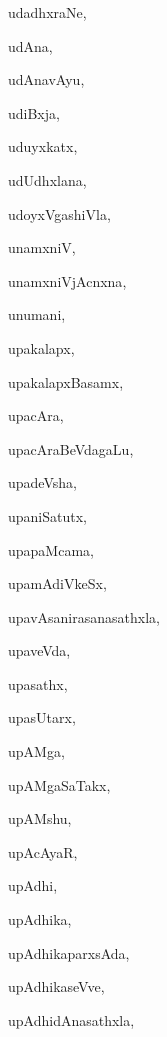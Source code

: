 \begin{multicols}{3}
{\noindent
{udadhxraNe}, \pageref{udadhxraNe}

\noindent
{udAna}, \pageref{udAna}

\noindent
{udAnavAyu}, \pageref{udAnavAyu}

\noindent
{udiBxja}, \pageref{udiBxja}

\noindent
{uduyxkatx}, \pageref{uduyxkatx}

\noindent
{udUdhxlana}, \pageref{udUdhxlana}

\noindent
{udoyxVgashiVla}, \pageref{udoyxVgashiVla}

\noindent
{unamxniV}, \pageref{unamxniV}

\noindent
{unamxniVjAcnxna}, \pageref{unamxniVjAcnxna}

\noindent
{unumani}, \pageref{unumani}

\noindent
{upakalapx}, \pageref{upakalapx}

\noindent
{upakalapxBasamx}, \pageref{upakalapxBasamx}

\noindent
{upacAra}, \pageref{upacAra}

\noindent
{upacAraBeVdagaLu}, \pageref{upacAraBeVdagaLu}

\noindent
{upadeVsha}, \pageref{upadeVsha}

\noindent
{upaniSatutx}, \pageref{upaniSatutx}

\noindent
{upapaMcama}, \pageref{upapaMcama}

\noindent
{upamAdiVkeSx}, \pageref{upamAdiVkeSx}

\noindent
{upavAsanirasanasathxla}, \pageref{upavAsanirasanasathxla}

\noindent
{upaveVda}, \pageref{upaveVda}

\noindent
{upasathx}, \pageref{upasathx}

\noindent
{upasUtarx}, \pageref{upasUtarx}

\noindent
{upAMga}, \pageref{upAMga}

\noindent
{upAMgaSaTakx}, \pageref{upAMgaSaTakx}

\noindent
{upAMshu}, \pageref{upAMshu}

\noindent
{upAcAyaR}, \pageref{upAcAyaR}

\noindent
{upAdhi}, \pageref{upAdhi}

\noindent
{upAdhika}, \pageref{upAdhika}

\noindent
{upAdhikaparxsAda}, \pageref{upAdhikaparxsAda}

\noindent
{upAdhikaseVve}, \pageref{upAdhikaseVve}

\noindent
{upAdhidAnasathxla}, \pageref{upAdhidAnasathxla}

}
\end{multicols}
